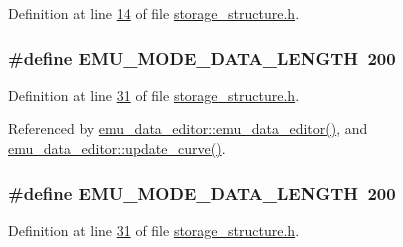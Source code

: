 Definition at line \hyperlink{a00003_source_l00014}{14} of file \hyperlink{a00003_source}{storage\+\_\+structure.\+h}.

\hypertarget{a00003_af4c3a8ad94feb4d7bda7f107f34baf41}{
\subsubsection[{E\+M\+U\+\_\+\+M\+O\+D\+E\+\_\+\+D\+A\+T\+A\+\_\+\+L\+E\+N\+G\+T\+H}]{\setlength{\rightskip}{0pt plus 5cm}\#define E\+M\+U\+\_\+\+M\+O\+D\+E\+\_\+\+D\+A\+T\+A\+\_\+\+L\+E\+N\+G\+T\+H~200}}\label{a00003_af4c3a8ad94feb4d7bda7f107f34baf41}


Definition at line \hyperlink{a00003_source_l00031}{31} of file \hyperlink{a00003_source}{storage\+\_\+structure.\+h}.



Referenced by \hyperlink{a00035_source_l00012}{emu\+\_\+data\+\_\+editor\+::emu\+\_\+data\+\_\+editor()}, and \hyperlink{a00035_source_l00284}{emu\+\_\+data\+\_\+editor\+::update\+\_\+curve()}.

\hypertarget{a00003_af4c3a8ad94feb4d7bda7f107f34baf41}{
\subsubsection[{E\+M\+U\+\_\+\+M\+O\+D\+E\+\_\+\+D\+A\+T\+A\+\_\+\+L\+E\+N\+G\+T\+H}]{\setlength{\rightskip}{0pt plus 5cm}\#define E\+M\+U\+\_\+\+M\+O\+D\+E\+\_\+\+D\+A\+T\+A\+\_\+\+L\+E\+N\+G\+T\+H~200}}\label{a00003_af4c3a8ad94feb4d7bda7f107f34baf41}


Definition at line \hyperlink{a00003_source_l00031}{31} of file \hyperlink{a00003_source}{storage\+\_\+structure.\+h}.

